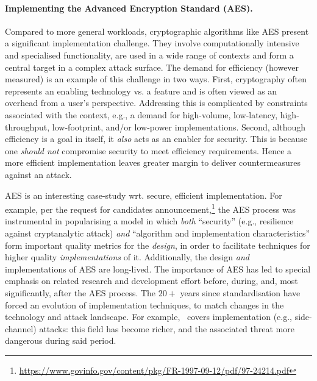 
\paragraph{Implementing the Advanced Encryption Standard (AES).}

%
%

Compared to more general workloads, cryptographic algorithms like AES
present a significant implementation challenge.
They involve computationally intensive and specialised functionality,
are used in a wide range of contexts
and
form a central target in a complex attack surface.
The demand for efficiency (however measured) is an example of this
challenge in two ways.
First,
cryptography often represents an enabling technology vs. a feature and
is often viewed as an overhead from a user's perspective.
Addressing this is
complicated by constraints associated with the context, e.g., a demand 
for
high-volume, 
 low-latency, 
high-throughput, 
 low-footprint, 
and/or 
 low-power
 implementations.
Second,
although efficiency is a goal in itself, it {\em also} 
acts as an enabler for security.
This is because one {\em should not}
compromise security to meet efficiency requirements.
Hence a more efficient implementation leaves greater margin to deliver
countermeasures against an attack.

AES is an interesting case-study wrt. secure, efficient implementation.
For example,
per the request for candidates announcement,\footnote{%
\url{https://www.govinfo.gov/content/pkg/FR-1997-09-12/pdf/97-24214.pdf}
} the AES process was instrumental in popularising a model in which
{\em both}
``security''
(e.g., resilience against cryptanalytic attack)
{\em and}
``algorithm and implementation characteristics''
form important quality metrics for the {\em design}, in order to facilitate
techniques for higher quality {\em implementations} of it.
Additionally,
the design {\em and} implementations of AES are long-lived.
The importance of AES has led to special emphasis on related
research and development effort before, during, and, most significantly, 
after the AES process.
The $20+$ years since standardisation have forced an evolution of 
implementation techniques, to match changes in the technology 
and attack landscape.  For example,~\cite[Section 3.6]{NBBBDFR:01} covers
implementation (e.g., side-channel) attacks: this field has become richer,
and the associated threat more dangerous during said period.

